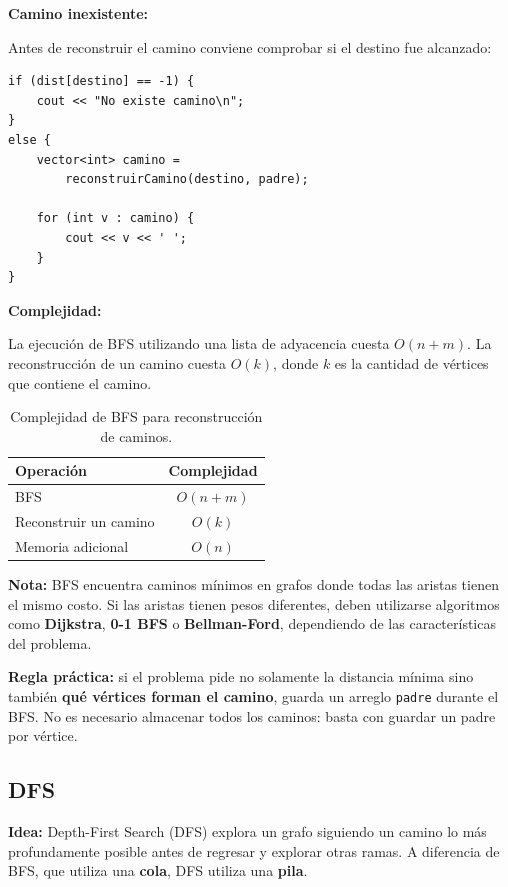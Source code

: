 \documentclass[10pt,a4paper,twocolumn]{article}
\begin{document}
\textbf{Camino inexistente:}

Antes de reconstruir el camino conviene comprobar si el destino fue
alcanzado:

\begin{lstlisting}[style=cpp]
if (dist[destino] == -1) {
    cout << "No existe camino\n";
}
else {
    vector<int> camino =
        reconstruirCamino(destino, padre);

    for (int v : camino) {
        cout << v << ' ';
    }
}
\end{lstlisting}

\textbf{Complejidad:}

La ejecución de BFS utilizando una lista de adyacencia cuesta
$O(n+m)$. La reconstrucción de un camino cuesta $O(k)$, donde $k$ es
la cantidad de vértices que contiene el camino.

\begin{table}[H]
\raggedright
\scriptsize
\setlength{\tabcolsep}{3pt}
\renewcommand{\arraystretch}{1.1}
\begin{tabular}{|l|c|}
\hline
\textbf{Operación} & \textbf{Complejidad} \\
\hline
BFS & $O(n+m)$ \\
\hline
Reconstruir un camino & $O(k)$ \\
\hline
Memoria adicional & $O(n)$ \\
\hline
\end{tabular}
\caption{Complejidad de BFS para reconstrucción de caminos.}
\end{table}

\textbf{Nota:} BFS encuentra caminos mínimos en grafos donde todas las
aristas tienen el mismo costo. Si las aristas tienen pesos diferentes,
deben utilizarse algoritmos como \textbf{Dijkstra}, \textbf{0-1 BFS} o
\textbf{Bellman-Ford}, dependiendo de las características del problema.

\textbf{Regla práctica:} si el problema pide no solamente la distancia
mínima sino también \textbf{qué vértices forman el camino}, guarda un
arreglo \texttt{padre} durante el BFS. No es necesario almacenar todos
los caminos: basta con guardar un padre por vértice.

\subsection{DFS}

\textbf{Idea:} Depth-First Search (DFS) explora un grafo siguiendo un
camino lo más profundamente posible antes de regresar y explorar otras
ramas. A diferencia de BFS, que utiliza una \textbf{cola}, DFS utiliza
una \textbf{pila}.
\end{document}
